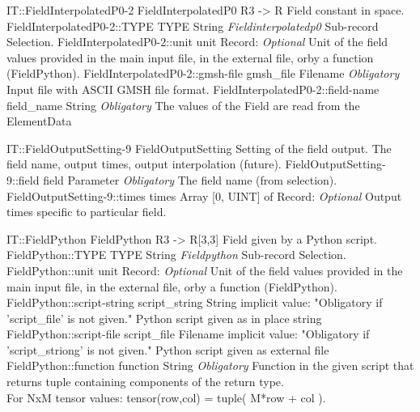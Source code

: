 \begin{RecordType}
	{IT::FieldInterpolatedP0-2}
	{FieldInterpolatedP0}
	{} %
	{} %
	{{{R3 -{\textgreater} R Field constant in space.}}}
		\RecKey
			{FieldInterpolatedP0-2::TYPE}
			{TYPE}
			{{String}}
			{ \it{Fieldinterpolatedp0} }
			{{{Sub-record Selection.}}}
		\RecKey
			{FieldInterpolatedP0-2::unit}
			{unit}
			{{Record}{: }}
			{ \it{Optional} }
			{{{Unit of the field values provided in the main input file, in the external file, orby a function (FieldPython).}}}
		\RecKey
			{FieldInterpolatedP0-2::gmsh-file}
			{gmsh{\_}file}
			{{Filename}}
			{ \it{Obligatory} }
			{{{Input file with ASCII GMSH file format.}}}
		\RecKey
			{FieldInterpolatedP0-2::field-name}
			{field{\_}name}
			{{String}}
			{ \it{Obligatory} }
			{{{The values of the Field are read from the }\ttfamily {\$}ElementData}}
\end{RecordType}
\begin{RecordType}
	{IT::FieldOutputSetting-9}
	{FieldOutputSetting}
	{} %
	{} %
	{{{Setting of the field output. The field name, output times, output interpolation (future).}}}
		\RecKey
			{FieldOutputSetting-9::field}
			{field}
			{{Parameter}}
			{ \it{Obligatory} }
			{{{The field name (from selection).}}}
		\RecKey
			{FieldOutputSetting-9::times}
			{times}
			{{Array [0, UINT] of }{Record}{: }}
			{ \it{Optional} }
			{{{Output times specific to particular field.}}}
\end{RecordType}
\begin{RecordType}
	{IT::FieldPython}
	{FieldPython}
	{} %
	{} %
	{{{R3 -{\textgreater} R[3,3] Field given by a Python script.}}}
		\RecKey
			{FieldPython::TYPE}
			{TYPE}
			{{String}}
			{ \it{Fieldpython} }
			{{{Sub-record Selection.}}}
		\RecKey
			{FieldPython::unit}
			{unit}
			{{Record}{: }}
			{ \it{Optional} }
			{{{Unit of the field values provided in the main input file, in the external file, orby a function (FieldPython).}}}
		\RecKey
			{FieldPython::script-string}
			{script{\_}string}
			{{String}}
			{implicit value: "{Obligatory if 'script{\_}file' is not given.}"}
			{{{Python script given as in place string}}}
		\RecKey
			{FieldPython::script-file}
			{script{\_}file}
			{{Filename}}
			{implicit value: "{Obligatory if 'script{\_}striong' is not given.}"}
			{{{Python script given as external file}}}
		\RecKey
			{FieldPython::function}
			{function}
			{{String}}
			{ \it{Obligatory} }
			{{{Function in the given script that returns tuple containing components of the return type.}\\{
For NxM tensor values: tensor(row,col) = tuple( M*row + col ).}}}
\end{RecordType}

